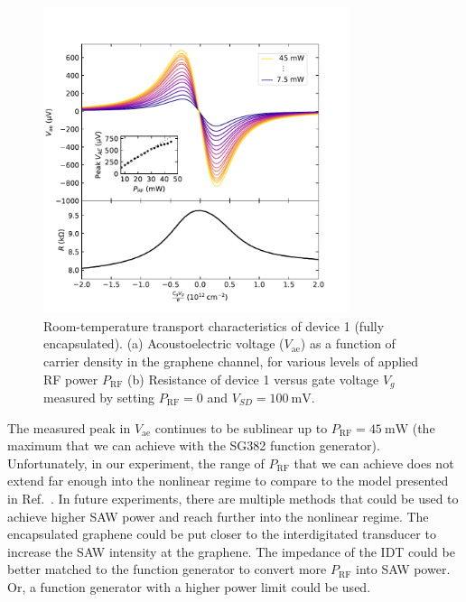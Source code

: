 \documentclass{beavtex_dub_edit}
\begin{document}
\begin{figure}
    \includegraphics[width = 0.8\textwidth]{AEV V3 power series plot_output.pdf}
    \caption{Room-temperature transport characteristics of device 1 (fully encapsulated). (a) Acoustoelectric voltage ($V_{\mathrm{ae}}$) as a function of carrier density in the graphene channel, for various levels of applied RF power $P_{\mathrm{RF}}$ (b) Resistance of device 1 versus gate voltage $V_g$ measured by setting $P_{\mathrm{RF}} = 0$ and $V_{SD} = \SI{100}{\milli\volt}$.}
    \label{AEV nonlinear series}
\end{figure}
The measured peak in $V_{\mathrm{ae}}$ continues to be sublinear up to $P_{\mathrm{RF}} = \SI{45}{\milli\watt}$ (the maximum that we can achieve with the SG382 function generator). Unfortunately, in our experiment, the range of $P_{\mathrm{RF}}$ that we can achieve does not extend far enough into the nonlinear regime to compare to the model presented in Ref.\ \cite{rotter_nonlinear_1999}. In future experiments, there are multiple methods that could be used to achieve higher SAW power and reach further into the nonlinear regime. The encapsulated graphene could be put closer to the interdigitated transducer to increase the SAW intensity at the graphene. The impedance of the IDT could be better matched to the function generator to convert more $P_{\mathrm{RF}}$ into SAW power. Or, a function generator with a higher power limit could be used.
\end{document}

